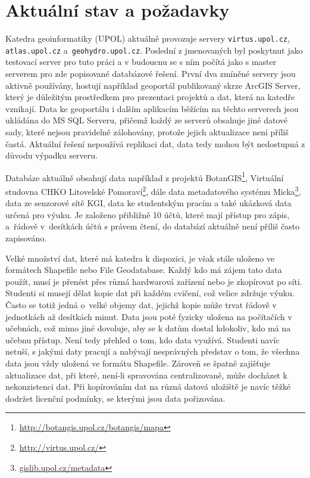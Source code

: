 \section{Aktuální stav a požadavky}
\label{kAktualniStav}

Katedra geoinformatiky (UPOL) aktuálně provozuje servery \texttt{virtus.upol.cz}, \texttt{atlas.upol.cz} a~\texttt{geo\-hydro.upol.cz}. Poslední z jmenovaných byl poskytnut jako testovací server pro tuto práci a v budoucnu se s ním počítá jako s master serverem pro zde popisované databázové řešení. První dva zmíněné servery jsou aktivně používány, hostují nap\-řík\-lad geoportál publikovaný skrze Arc\-GIS Server, který je důležitým prostředkem pro prezentaci projektů a dat, která na katedře vznikají. Data ke geoportálu i dalším aplikacím běžícím na těchto serverech jsou ukládána do MS SQL Serveru, přičemž každý ze serverů obsahuje jiné datové sady, které nejsou pravidelně zálohovány, protože jejich aktualizace není příliš častá. Aktuální řešení nepoužívá replikaci dat, data tedy mohou být nedostupná z důvodu výpadku serveru. 

Databáze aktuálně obsahují data například z projektů BotanGIS\footnote{\url{http://botangis.upol.cz/botangis/mapa}}, Virtuální studovna CHKO Litovelské Pomoraví\footnote{\url{http://virtus.upol.cz/}}, dále data metadatového systému Micka\footnote{\url{gislib.upol.cz/metadata}}, data ze senzorové sítě KGI, data ke studentským pracím a také ukázková data určená pro výuku. Je založeno přibližně 10 účtů, které mají přístup pro zápis, a~řádově v~desítkách účtů s právem čtení, do databází aktuálně není příliš často zapisováno. 

Velké množství dat, které má katedra k dispozici, je však stále uloženo ve formátech Shapefile nebo File Geodatabase. Každý kdo má zájem tato data použít, musí je přenést přes různá hardwarová zařízení nebo je zkopírovat po síti. Studenti si musejí dělat kopie dat při každém cvičení, což velice zdržuje výuku. Často se totiž jedná o~velké objemy dat, jejichž kopie může trvat řádově v jednotkách až desítkách minut. Data jsou poté fyzicky uložena na počítačích v učebnách, což mimo jiné dovoluje, aby se k datům dostal kdokoliv, kdo má na učebnu přístup. Není tedy přehled o tom, kdo data využívá. Studenti navíc netuší, s jakými daty pracují a nabývají nesprávných představ o tom, že všechna data jsou vždy uložená ve formátu Shapefile. Zároveň se špatně zajišťuje ak\-tu\-a\-lizace dat, při které, není-li spravována centralizovaně, může docházet k nekonzistenci dat. Při kopírováním dat na různá datová uložiště je navíc těžké dodržet licenční podmínky, se kterými jsou data pořizována. 

